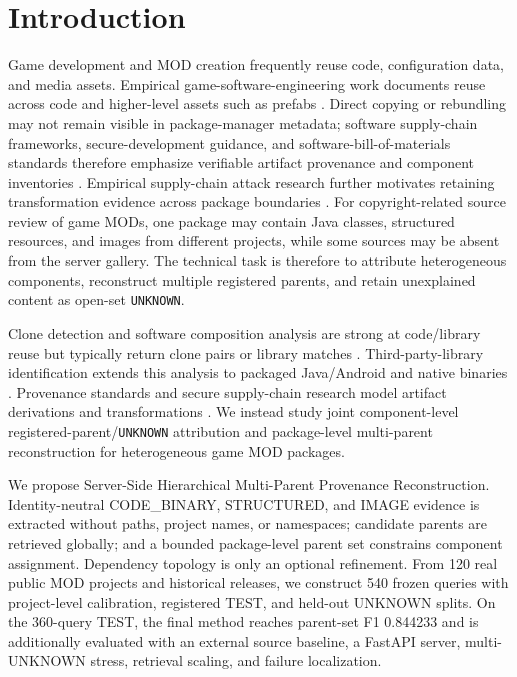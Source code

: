 \documentclass[runningheads]{llncs}
\begin{document}
\section{Introduction}

Game development and MOD creation frequently reuse code, configuration data, and media assets. Empirical game-software-engineering work documents reuse across code and higher-level assets such as prefabs \cite{trasobares2025reuse}. Direct copying or rebundling may not remain visible in package-manager metadata; software supply-chain frameworks, secure-development guidance, and software-bill-of-materials standards therefore emphasize verifiable artifact provenance and component inventories \cite{torresarias2019intoto,nist2022ssdf,iso5962spdx}. Empirical supply-chain attack research further motivates retaining transformation evidence across package boundaries \cite{ohm2020backstabber}. For copyright-related source review of game MODs, one package may contain Java classes, structured resources, and images from different projects, while some sources may be absent from the server gallery. The technical task is therefore to attribute heterogeneous components, reconstruct multiple registered parents, and retain unexplained content as open-set \texttt{UNKNOWN}.

Clone detection and software composition analysis are strong at code/library reuse but typically return clone pairs or library matches \cite{roy2008nicad,sajnani2016sourcerer,heinze2026stone}. Third-party-library identification extends this analysis to packaged Java/Android and native binaries \cite{backes2016libscout,bincofer2025}. Provenance standards and secure supply-chain research model artifact derivations and transformations \cite{w3c2013provdm,torresarias2019intoto}. We instead study joint component-level registered-parent/\texttt{UNKNOWN} attribution and package-level multi-parent reconstruction for heterogeneous game MOD packages.

We propose Server-Side Hierarchical Multi-Parent Provenance Reconstruction. Identity-neutral CODE\_BINARY, STRUCTURED, and IMAGE evidence is extracted without paths, project names, or namespaces; candidate parents are retrieved globally; and a bounded package-level parent set constrains component assignment. Dependency topology is only an optional refinement. From 120 real public MOD projects and historical releases, we construct 540 frozen queries with project-level calibration, registered TEST, and held-out UNKNOWN splits. On the 360-query TEST, the final method reaches parent-set F1 0.844233 and is additionally evaluated with an external source baseline, a FastAPI server, multi-UNKNOWN stress, retrieval scaling, and failure localization.
\end{document}
